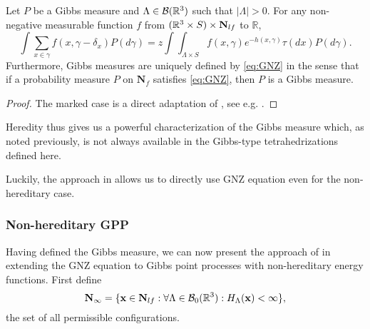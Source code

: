 \begin{proposition} Let $P$ be a Gibbs measure and $\Lambda \in \mathcal B({\mathbb R^3})$ such that $|\Lambda|>0$. For any non-negative measurable function $f$ from $({\mathbb R^3}\times S)\times \mathbf N_{lf}$ to $\mathbb R$,
	\begin{equation}\label{eq:GNZ}\int \sum_{x \in \gamma} f(x,\gamma- \delta_x) P(d\gamma) = z \int \int_{\Lambda\times S} f(x,\gamma) e^{-h(x,\gamma)} \tau(dx) P (d\gamma).\end{equation}
	Furthermore, Gibbs measures are uniquely defined by \eqref{eq:GNZ} in the sense that if a probability measure $P$ on $\mathbf N_f$ satisfies \eqref{eq:GNZ}, then $P$ is a Gibbs measure.
\end{proposition}
\begin{proof}
	The marked case is a direct adaptation of \cite{NguyenZessin1979}, see e.g. \cite{Mase2000}.		
\end{proof}

Heredity thus gives us a powerful characterization of the Gibbs measure which, as noted previously, is not always available in the Gibbs-type tetrahedrizations defined here. 
 

Luckily, the approach in \cite{DereudreLavancier2009} allows us to directly use GNZ equation even for the non-hereditary case. 

% 
% 
% 


\subsubsection{Non-hereditary GPP}\label{sec:non-hereditary}
Having defined the Gibbs measure, we can now present the approach of \cite{DereudreLavancier2009} in extending the GNZ equation to Gibbs point processes with non-hereditary energy functions. First define 
$$\mathbf N_\infty = \{{\mathbf{x}} \in \mathbf N_{lf}: \forall \Lambda \in \mathcal B_0({\mathbb R^3}): H_\Lambda({\mathbf{x}})< \infty\},$$
the set of all permissible configurations.

